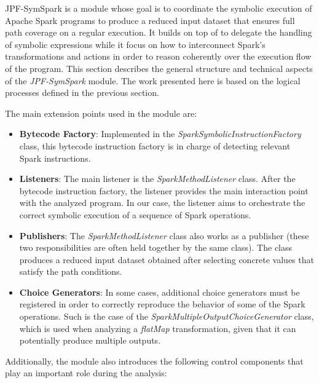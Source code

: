 \label{sec:jpf-symspark}

JPF-SymSpark is a \jpf{} module whose goal is to coordinate the symbolic execution of Apache Spark programs to produce a reduced input dataset that ensures full path coverage on a regular execution. It builds on top of \spf{} to delegate the handling of symbolic expressions while it focus on how to interconnect Spark's transformations and actions in order to reason coherently over the execution flow of the program. This section describes the general structure and technical aspects of the \textit{JPF-SymSpark} module. The work presented here is based on the logical processes defined in the previous section. 

The main \jpf{} extension points used in the module are:

\begin{itemize}
	\item \textbf{Bytecode Factory}: Implemented in the \textit{SparkSymbolicInstructionFactory} class, this bytecode instruction factory is in charge of detecting relevant Spark instructions.
	\item \textbf{Listeners}: The main listener is the \textit{SparkMethodListener} class. After the bytecode instruction factory, the listener provides the main interaction point with the analyzed program. In our case, the listener aims to orchestrate the correct symbolic execution of a sequence of Spark operations.
	\item \textbf{Publishers}: The \textit{SparkMethodListener} class also works as a publisher (these two responsibilities are often held together by the same class). The class produces a reduced input dataset obtained after selecting concrete values that satisfy the path conditions.
	\item \textbf{Choice Generators}: In some cases, additional choice generators must be registered in order to correctly reproduce the behavior of some of the Spark operations. Such is the case of the \textit{SparkMultipleOutputChoiceGenerator} class, which is used when analyzing a \textit{flatMap} transformation, given that it can potentially produce multiple outputs.
\end{itemize}

Additionally, the module also introduces the following control components that play an important role during the analysis:

